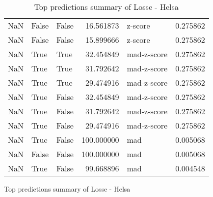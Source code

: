 \begin{table}[htp]
\begin{tabular}{rllrlr}
         NaN &          False &       False &  16.561873 &     z-score &  0.275862 \\
         NaN &          False &       False &  15.899666 &     z-score &  0.275862 \\
         NaN &           True &        True &  32.454849 & mad-z-score &  0.275862 \\
         NaN &           True &        True &  31.792642 & mad-z-score &  0.275862 \\
         NaN &           True &        True &  29.474916 & mad-z-score &  0.275862 \\
         NaN &           True &       False &  32.454849 & mad-z-score &  0.275862 \\
         NaN &           True &       False &  31.792642 & mad-z-score &  0.275862 \\
         NaN &           True &       False &  29.474916 & mad-z-score &  0.275862 \\
         NaN &           True &       False & 100.000000 &         mad &  0.005068 \\
         NaN &          False &       False & 100.000000 &         mad &  0.005068 \\
         NaN &           True &       False &  99.668896 &         mad &  0.004548 \\
\bottomrule
\end{tabular}
\caption{Top predictions summary of Losse - Helsa}
\label{table:42960105-de-top-predictions-summary}
\caption{Top predictions summary of Losse - Helsa}
\label{table:42960105-de-top-predictions-summary}
\end{table}

